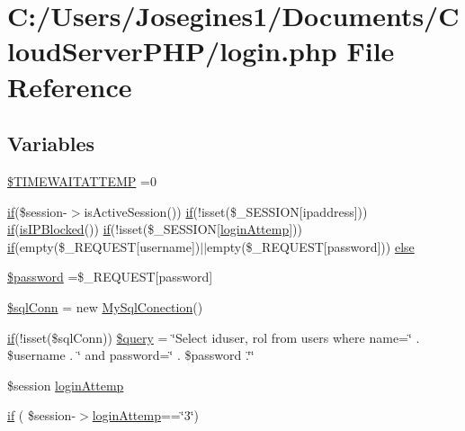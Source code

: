 \hypertarget{login_8php}{}\section{C\+:/\+Users/\+Josegines1/\+Documents/\+Cloud\+Server\+P\+H\+P/login.php File Reference}
\label{login_8php}
\subsection*{Variables}
\begin{DoxyCompactItemize}
\item 
\mbox{\hyperlink{login_8php_a6b519bd0b335c8e4ba5749a42b2e2044}{\$\+T\+I\+M\+E\+W\+A\+I\+T\+A\+T\+T\+E\+MP}} =0
\item 
\mbox{\hyperlink{login_8php_a1e9ad7645a82f87ff70cac2447de1c76}{if}}(\$session-\/$>$is\+Active\+Session()) \mbox{\hyperlink{login_8php_a1e9ad7645a82f87ff70cac2447de1c76}{if}}(!isset(\$\+\_\+\+S\+E\+S\+S\+I\+ON\mbox{[}\textquotesingle{}ipaddress\textquotesingle{}\mbox{]})) \mbox{\hyperlink{login_8php_a1e9ad7645a82f87ff70cac2447de1c76}{if}}(\mbox{\hyperlink{security_8php_abddcb605984b484876498005966cc86d}{is\+I\+P\+Blocked}}()) \mbox{\hyperlink{login_8php_a1e9ad7645a82f87ff70cac2447de1c76}{if}}(!isset(\$\+\_\+\+S\+E\+S\+S\+I\+ON\mbox{[}\textquotesingle{}\mbox{\hyperlink{login_8php_a66bd0a4d3f2564c19188e8257c34147d}{login\+Attemp}}\textquotesingle{}\mbox{]})) \mbox{\hyperlink{login_8php_a1e9ad7645a82f87ff70cac2447de1c76}{if}}(empty(\$\+\_\+\+R\+E\+Q\+U\+E\+ST\mbox{[}\textquotesingle{}username\textquotesingle{}\mbox{]})$\vert$$\vert$empty(\$\+\_\+\+R\+E\+Q\+U\+E\+ST\mbox{[}\textquotesingle{}password\textquotesingle{}\mbox{]})) \mbox{\hyperlink{login_8php_a8fdf19f1f601d8e738a213636ddd1c0d}{else}}
\item 
\mbox{\hyperlink{login_8php_a607686ef9f99ea7c42f4f3dd3dbb2b0d}{\$password}} =\$\+\_\+\+R\+E\+Q\+U\+E\+ST\mbox{[}\textquotesingle{}password\textquotesingle{}\mbox{]}
\item 
\mbox{\hyperlink{login_8php_a3a26d65da376886516c18dee60212ac0}{\$sql\+Conn}} = new \mbox{\hyperlink{class_my_sql_conection}{My\+Sql\+Conection}}()
\item 
\mbox{\hyperlink{login_8php_a1e9ad7645a82f87ff70cac2447de1c76}{if}}(!isset(\$sql\+Conn)) \mbox{\hyperlink{login_8php_aba0d29cd67eb7a1e6acf4ced79608c75}{\$query}} = \char`\"{}Select iduser, rol from users where name=\textquotesingle{}\char`\"{} . \$username . \char`\"{}\textquotesingle{} and password=\textquotesingle{}\char`\"{} . \$password .\char`\"{}\textquotesingle{}\char`\"{}
\item 
\$session \mbox{\hyperlink{login_8php_a66bd0a4d3f2564c19188e8257c34147d}{login\+Attemp}}
\item 
\mbox{\hyperlink{login_8php_a1e9ad7645a82f87ff70cac2447de1c76}{if}} ( \$session-\/$>$\mbox{\hyperlink{login_8php_a66bd0a4d3f2564c19188e8257c34147d}{login\+Attemp}}==\char`\"{}3\char`\"{})
\end{DoxyCompactItemize}


